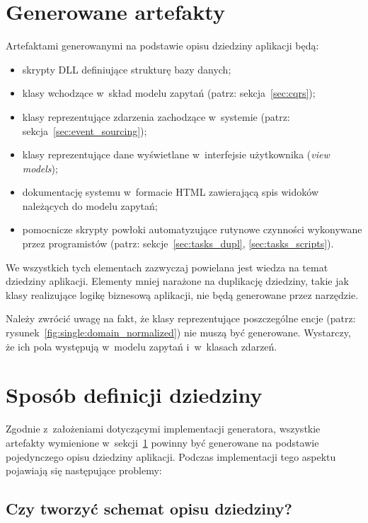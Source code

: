 \section{Generowane artefakty} \label{sec:generated_artifacts}

Artefaktami generowanymi na podstawie opisu dziedziny aplikacji będą:

\begin{itemize}
 \item skrypty DLL definiujące strukturę bazy danych;
 \item klasy wchodzące w~skład modelu zapytań (patrz: sekcja~\ref{sec:cqrs});
 \item klasy reprezentujące zdarzenia zachodzące w~systemie (patrz: sekcja~\ref{sec:event_sourcing});
 \item klasy reprezentujące dane wyświetlane w~interfejsie użytkownika (\emph{view models});
 \item dokumentację systemu w~formacie HTML zawierającą spis widoków należących do modelu zapytań;
 \item pomocnicze skrypty powłoki automatyzujące rutynowe czynności wykonywane przez programistów (patrz: sekcje~\ref{sec:tasks_dupl}, \ref{sec:tasks_scripts}).
\end{itemize}

We wszystkich tych elementach zazwyczaj powielana jest wiedza na temat dziedziny aplikacji.
Elementy mniej narażone na duplikację dziedziny, takie jak klasy realizujące logikę biznesową aplikacji, nie będą generowane przez narzędzie.

Należy zwrócić uwagę na fakt, że klasy reprezentujące poszczególne encje (patrz: rysunek~\ref{fig:single:domain_normalized}) nie muszą być generowane.
Wystarczy, że ich pola występują w~modelu zapytań i~w~klasach zdarzeń.



\section{Sposób definicji dziedziny} \label{sec:domain_schema_definition}

Zgodnie z~założeniami dotyczącymi implementacji generatora, wszystkie artefakty wymienione w~sekcji~\ref{sec:generated_artifacts} powinny być generowane na podstawie pojedynczego opisu dziedziny aplikacji.
Podczas implementacji tego aspektu pojawiają się następujące problemy:


\subsection{Czy tworzyć schemat opisu dziedziny?}

